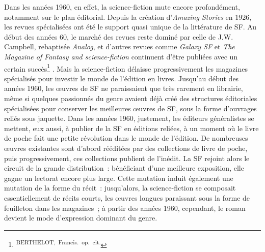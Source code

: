 \documentclass[letterpaper,portrait,12pt]{article}
\begin{document}
	Dans les ann\'{e}es 1960, en effet, la science-fiction mute encore profond\'{e}ment, notamment sur le plan \'{e}ditorial. Depuis la cr\'{e}ation d'\emph{Amazing Stories} en 1926, les revues sp\'{e}cialis\'{e}es ont \'{e}t\'{e} le support quasi unique de la litt\'{e}rature de SF. Au d\'{e}but des ann\'{e}es 60, le march\'{e} des revues reste domin\'{e} par celle de J.W. Campbell, rebaptis\'{e}e \emph{Analog}, et d'autres revues comme \emph{Galaxy SF} et \emph{The Magazine of Fantasy and science-fiction} continuent d'\^{e}tre publi\'{e}es avec un certain succ\`{e}s\footnote{\textsuperscript{\newpage
}\textsuperscript{	BERTHELOT,\ Francis.\ op.\ cit.}} . Mais la science-fiction d\'{e}laisse progressivement les magazines sp\'{e}cialis\'{e}s pour investir le monde de l'\'{e}dition en livres. Jusqu'au d\'{e}but des ann\'{e}es 1960, les \oe{}uvres de SF ne paraissaient que tr\`{e}s rarement en librairie, m\^{e}me si quelques passionn\'{e}s du genre avaient d\'{e}j\`{a} cr\'{e}\'{e} des structures \'{e}ditoriales sp\'{e}cialis\'{e}es pour conserver les meilleures \oe{}uvres de SF, sous la forme d'ouvrages reli\'{e}s sous jaquette. Dans les ann\'{e}es 1960, justement, les \'{e}diteurs g\'{e}n\'{e}ralistes se mettent, eux aussi, \`{a} publier de la SF en \'{e}ditions reli\'{e}es, \`{a} un moment où le livre de poche fait une petite r\'{e}volution dans le monde de l'\'{e}dition. De nombreuses \oe{}uvres existantes sont d'abord r\'{e}\'{e}dit\'{e}es par des collections de livre de poche, puis progressivement, ces collections publient de l'in\'{e}dit. La SF rejoint alors le circuit de la grande distribution : b\'{e}n\'{e}ficiant d'une meilleure exposition, elle gagne un lectorat encore plus large. Cette mutation induit \'{e}galement une mutation de la forme du r\'{e}cit : jusqu'alors, la science-fiction se composait essentiellement de r\'{e}cits courts, les \oe{}uvres longues paraissant sous la forme de feuilleton dans les magazines ; \`{a} partir des ann\'{e}es 1960, cependant, le roman devient le mode d'expression dominant du genre.
\end{document}

